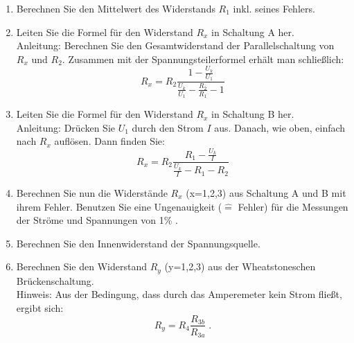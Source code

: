\begin{enumerate}
 \item Berechnen Sie den Mittelwert des Widerstands $R_1$ inkl. seines Fehlers.
 \item Leiten Sie die Formel für den Widerstand $R_x$ in Schaltung A her.\\
  Anleitung: Berechnen Sie den Gesamtwiderstand der Parallelschaltung von $R_x$ und $R_2$. Zusammen mit der Spannungsteilerformel erhält man schließlich:
  \begin{equation}
   R_x = R_2 \frac{1-\frac{U_k}{U_1}}{\frac{U_k}{U_1}-\frac{R_2}{R_1}-1}
  \end{equation}
 \item Leiten Sie die Formel für den Widerstand $R_x$ in Schaltung B her.\\
  Anleitung: Drücken Sie $U_1$ durch den Strom $I$ aus. Danach, wie oben, einfach nach $R_x$ auflösen. Dann finden Sie:
  \begin{equation}
   R_x = R_2 \frac{R_1 - \frac{U_k}{I}}{\frac{U_k}{I}-R_1-R_2}
  \end{equation}
 \item Berechnen Sie nun die Widerstände $R_x$ (x=1,2,3) aus Schaltung A und B mit ihrem Fehler. 
  Benutzen Sie eine Ungenauigkeit ($\hat{=}$ Fehler) für die Messungen der Ströme und Spannungen von 1\% .
 \item Berechnen Sie den Innenwiderstand der Spannungsquelle.
 \item Berechnen Sie den Widerstand $R_y$ (y=1,2,3) aus der Wheatstoneschen Brückenschaltung.\\
  Hinweis: Aus der Bedingung, dass durch das Amperemeter kein Strom fließt, ergibt sich:
  \begin{equation}
   R_y = R_4\frac{R_{3b}}{R_{3a}} \; .
  \end{equation}
\end{enumerate}